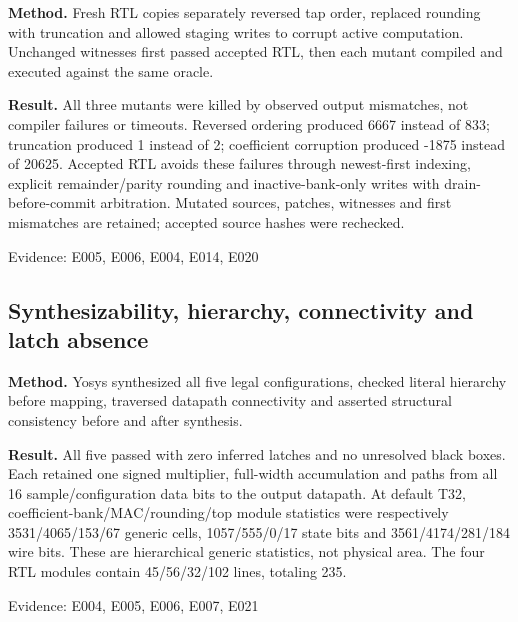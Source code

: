 \documentclass[11pt,a4paper]{article}
\begin{document}
\textbf{Method.} Fresh RTL copies separately reversed tap order,\allowbreak{} replaced rounding with truncation and allowed staging writes to corrupt active computation. Unchanged witnesses first passed accepted RTL,\allowbreak{} then each mutant compiled and executed against the same oracle.

\textbf{Result.} All three mutants were killed by observed output mismatches,\allowbreak{} not compiler failures or timeouts. Reversed ordering produced 6667 instead of 833; truncation produced 1 instead of 2; coefficient corruption produced -1875 instead of 20625. Accepted RTL avoids these failures through newest-first indexing,\allowbreak{} explicit remainder/\allowbreak{}parity rounding and inactive-bank-only writes with drain-before-commit arbitration. Mutated sources,\allowbreak{} patches,\allowbreak{} witnesses and first mismatches are retained; accepted source hashes were rechecked.

{\small Evidence: E005,\allowbreak{} E006,\allowbreak{} E004,\allowbreak{} E014,\allowbreak{} E020}

\subsection{Synthesizability,\allowbreak{} hierarchy,\allowbreak{} connectivity and latch absence}

\textbf{Method.} Yosys synthesized all five legal configurations,\allowbreak{} checked literal hierarchy before mapping,\allowbreak{} traversed datapath connectivity and asserted structural consistency before and after synthesis.

\textbf{Result.} All five passed with zero inferred latches and no unresolved black boxes. Each retained one signed multiplier,\allowbreak{} full-width accumulation and paths from all 16 sample/\allowbreak{}configuration data bits to the output datapath. At default T32,\allowbreak{} coefficient-bank/\allowbreak{}MAC/\allowbreak{}rounding/\allowbreak{}top module statistics were respectively 3531/\allowbreak{}4065/\allowbreak{}153/\allowbreak{}67 generic cells,\allowbreak{} 1057/\allowbreak{}555/\allowbreak{}0/\allowbreak{}17 state bits and 3561/\allowbreak{}4174/\allowbreak{}281/\allowbreak{}184 wire bits. These are hierarchical generic statistics,\allowbreak{} not physical area. The four RTL modules contain 45/\allowbreak{}56/\allowbreak{}32/\allowbreak{}102 lines,\allowbreak{} totaling 235.

{\small Evidence: E004,\allowbreak{} E005,\allowbreak{} E006,\allowbreak{} E007,\allowbreak{} E021}
\end{document}

